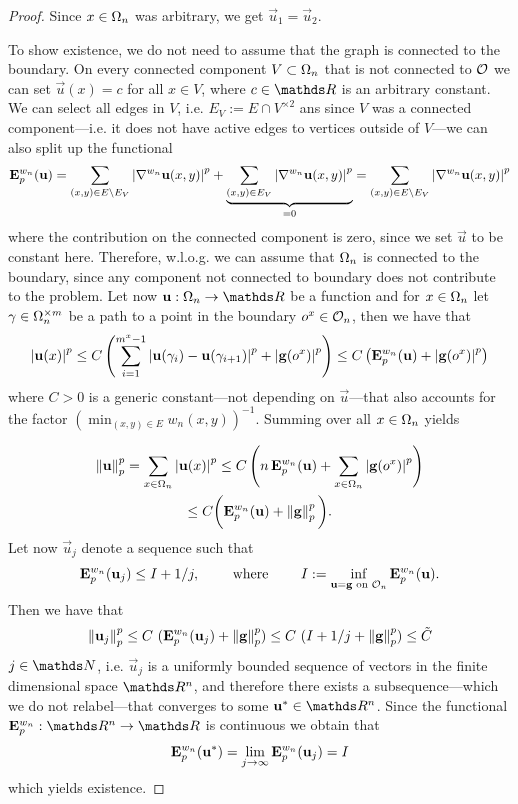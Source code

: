 \begin{proof}
%
Since $x\in\Omega_n$ was arbitrary, we get $\vec u_1 = \vec u_2$.\par
%
\noindent%
To show existence, we do not need to assume that the graph is connected to the boundary. On every connected component $V\subset \Omega_n$ that is not connected to $\mathcal{O}$ we can set $\vec u(x) = c$ for all $x\in V$, where $c\in\R$ is an arbitrary constant. We can select all edges in $V$, i.e. $E_V := E \cap V^{\times 2}$ ans since $V$ was a connected component---i.e. it does not have active edges to vertices outside of $V$---we can also split up the functional
%
\begin{align*}
\mathbf{E}^{w_n}_{p}(\mathbf{u}) = \sum_{(x,y)\in E\setminus E_V} \left|\nabla^{w_n} \mathbf{u}(x,y)\right|^p
+
\underbrace{\sum_{(x,y)\in E_V} \left|\nabla^{w_n} \mathbf{u}(x,y)\right|^p}_{=0} = 
\sum_{(x,y)\in E\setminus E_V} \left|\nabla^{w_n} \mathbf{u}(x,y)\right|^p
\end{align*}
%
where the contribution on the connected component is zero, since we set $\vec u$ to be constant here. Therefore, w.l.o.g. we can assume that $\Omega_n$ is connected to the boundary, since any component not connected to boundary does not contribute to the problem. Let now $\vec u:\domain_n\to\R$ be a function and for $x\in\Omega_n$ let $\gamma \in \Omega_n^{\times m}$ be a path to a point in the boundary $o^x\in\mathcal{O}_n$, then we have that
%
\begin{gather*}
\left|\mathbf{u}(x)\right|^p \leq C\left(\sum_{i=1}^{m^x-1}\left|\mathbf{u}(\gamma_{i}) - \mathbf{u}(\gamma_{i+1})\right|^p + \left|\mathbf{g}(o^x)\right|^p\right) \leq 
C\left(\mathbf{E}^{w_n}_p(\mathbf{u}) + \left|\mathbf{g}(o^x)\right|^p\right)
\end{gather*}
%
where $C>0$ is a generic constant---not depending on $\vec u$---that also accounts for the factor $\left(\min_{(x,y)\in E}w_n(x,y)\right)^{-1}$. Summing over all $x\in\Omega_n$ yields

\begin{gather*}
\norm{\vec u}^p_p = \sum_{x\in\domain_n} \abs{\vec u(x)}^p \leq 
C\left( n\, \GE^{w_n}_p(\vec u) + \sum_{x\in\domain_n} \abs{\vec g(o^x)}^p\right)\\
%
\leq  C \bigg(\GE^{w_n}_p(\vec u) + \norm{\vec g}^p_p\bigg).
\end{gather*}
%
Let now $\vec u_j$ denote a sequence such that
%
\begin{align*}
\mathbf{E}^{w_n}_p(\mathbf{u}_j) \leq I + 1/j,\qquad\text{ where }\qquad
I := \inf_{\mathbf{u}=\mathbf{g}\text{ on } \mathcal{O}_n} \mathbf{E}^{w_n}_p(\mathbf{u}).
\end{align*}
%
Then we have that
%
\begin{align*}
\left\|\mathbf{u}_j\right\|^p_p \leq C\ (\mathbf{E}^{w_n}_p(\mathbf{u}_j) + \left\|\mathbf{g}\right\|^p_p)
\leq C\ (I + 1/j + \left\|\mathbf{g}\right\|^p_p) \leq \tilde C
\end{align*}
%
$j\in\N$, i.e. $\vec u_j$ is a uniformly bounded sequence of vectors in the finite dimensional space $\R^n$, and therefore there exists a subsequence---which we do not relabel---that converges to some $\vec u^\ast\in\R^n$. Since the functional $\GE^{w_n}_p:\R^n\to\R$ is continuous we obtain that
%
\begin{align*}
\mathbf{E}^{w_n}_p(\mathbf{u}^\ast) = \lim_{j\to\infty} \mathbf{E}^{w_n}_p(\mathbf{u}_j) = I
\end{align*}
%
which yields existence.
\end{proof}
%
%
